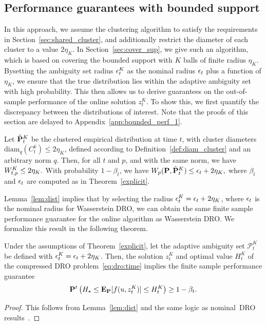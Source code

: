 \subsection{Performance guarantees with bounded support}
\label{sec:bounded_cover_performance}
In this approach, we assume the clustering algorithm to satisfy the requirements in Section~\ref{sec:shared_cluster}, and additionally restrict the diameter of each cluster to a value $2\eta_K$. In Section~\ref{sec:cover_sup}, we give such an algorithm, which is based on covering the bounded support with $K$ balls of finite radius $\eta_K$.
Bysetting the ambiguity set radius $\epsilon^K_t$ as the nominal radius $\epsilon_t$ plus a function of $\eta_K$, we ensure that the true distribution lies within the adaptive ambiguity set with high probability. This then allows us to derive guarantees on the out-of-sample performance of the online solution $z^K_{t}$.
To show this, we first quantify the discrepancy between the distributions of interest. Note that the proofs of this section are delayed to Appendix~\ref{app:bounded_perf_1}. 
\begin{lemma} 
\label{lem:dist} 
Let $\hat{{\mathbf P}}^K_t$ be the clustered empirical distribution at time $t$, with cluster diameters $\mathrm{diam}_q(C^k_t) \leq 2\eta_K$, defined according to Definition~\ref{def:diam_cluster} and an arbitrary norm $q$. Then, for all $t$ and $p$, and with the same norm, we have 
$W^K_{t,p} \leq 2\eta_K.$ With probability $1-
\beta_t$, we have
$ W_p(\mathbf{P}, \hat{\mathbf{P}}^K_t)  \leq \epsilon_t + 2\eta_K,$ where $\beta_t$ and $\epsilon_t$ are computed as in Theorem~\ref{explicit}.
\end{lemma}
Lemma~\ref{lem:dist} implies that by selecting the radius $\epsilon^K_t = \epsilon_t + 2\eta_K$, where $\epsilon_t$ is the nominal radius for Wasserstein \gls{DRO}, we can obtain the same finite sample performance guarantee for the online algorithm as Wasserstein \gls{DRO}. 
We formalize this result in the following theorem. 
\begin{theorem}\label{lemma:guarantees_fin}
Under the assumptions of Theorem~\ref{explicit}, let the adaptive ambiguity set $\mathcal{P}^K_{t}$ be defined with $\epsilon^K_{t} = \epsilon_{t} + 2\eta_K$. Then, the solution $z^K_{t}$ and optimal value $H^K_t$ of the compressed \gls{DRO} problem~\eqref{eq:dro:time} implies the finite sample performance guarantee
\begin{equation*}
	{\mathbf P}^{t}\left( H_\star \leq \mathbf{E}_{{\mathbf P}}[f(u, z^K_{t})] \le H^K_t\right) \ge 1 - \beta_{t}.
\end{equation*}
\end{theorem}
\begin{proof}
    This follows from Lemma~\ref{lem:dist} and the same logic as nominal~\gls{DRO} results~\cite[Theorem 3.5]{mohajerin2018data}.
\end{proof}

